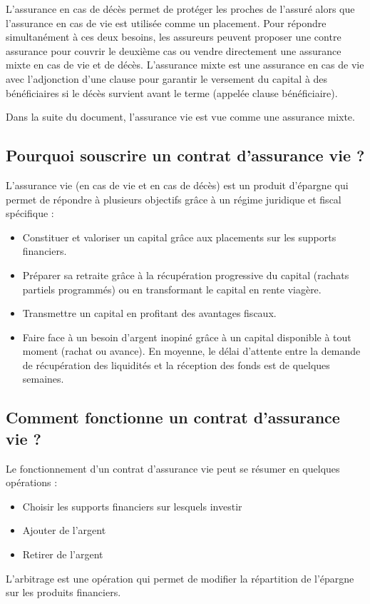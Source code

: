 \documentclass{article}
\begin{document}
L'assurance en cas de décès permet de protéger les proches de l'assuré alors que l'assurance en cas de vie est utilisée comme un placement. Pour répondre simultanément à ces deux besoins, les assureurs peuvent proposer une contre assurance pour couvrir le deuxième cas ou vendre directement une assurance mixte en cas de vie et de décès. L'assurance mixte est une assurance en cas de vie avec l'adjonction d'une clause pour garantir le versement du capital à des bénéficiaires si le décès survient avant le terme (appelée clause bénéficiaire).

Dans la suite du document, l'assurance vie est vue comme une assurance mixte.

\subsection{Pourquoi souscrire un contrat d'assurance vie ?}
L'assurance vie (en cas de vie et en cas de décès) est un produit d'épargne qui permet de répondre à plusieurs objectifs grâce à un régime juridique et fiscal spécifique :
\begin{itemize}
    \item Constituer et valoriser un capital grâce aux placements sur les supports financiers.
    \item Préparer sa retraite grâce à la récupération progressive du capital (rachats partiels programmés) ou en transformant le capital en rente viagère. 
    \item Transmettre un capital en profitant des avantages fiscaux.
    \item Faire face à un besoin d'argent inopiné grâce à un capital disponible à tout moment (rachat ou avance). En moyenne, le délai d'attente entre la demande de récupération des liquidités et la réception des fonds est de quelques semaines.
\end{itemize}

\subsection{Comment fonctionne un contrat d'assurance vie ?}
Le fonctionnement d'un contrat d'assurance vie peut se résumer en quelques opérations :
\begin{itemize}
    \item Choisir les supports financiers sur lesquels investir
    \item Ajouter de l'argent
    \item Retirer de l'argent
\end{itemize}
L'arbitrage est une opération qui permet de modifier la répartition de l'épargne sur les produits financiers.
\end{document}
